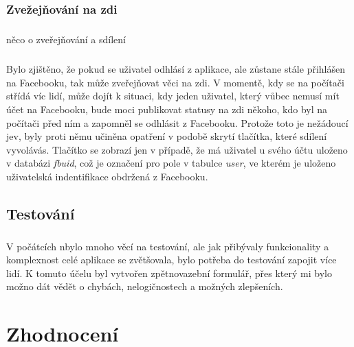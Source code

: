 \documentclass[11pt,a4paper,titlepage,oneside]{book}
\begin{document}
			\subsection{Zvežejňování na zdi}
				\paragraph{} {\Huge něco o zveřejňování a sdílení}
				\paragraph{} Bylo zjištěno, že pokud se uživatel odhlásí z aplikace, ale zůstane stále přihlášen na Facebooku, tak může zveřejňovat věci na zdi. V momentě, kdy se na počítači střídá víc lidí, může dojít k situaci, kdy jeden uživatel, který vůbec nemusí mít účet na Facebooku, bude moci publikovat statusy na zdi někoho, kdo byl na počítači před ním a zapomněl se odhlásit z Facebooku. Protože toto je nežádoucí jev, byly proti němu učiněna opatření v podobě skrytí tlačítka, které sdílení vyvolávás. Tlačítko se zobrazí jen v případě, že má uživatel u svého účtu uloženo v databázi \textit{fbuid}, což je označení pro pole v tabulce \textit{user}, ve kterém je uloženo uživatelská indentifikace obdržená z Facebooku.
		\section{Testování}
			\paragraph{}V počátcích nbylo mnoho věcí na testování, ale jak přibývaly funkcionality a komplexnost celé aplikace se zvětšovala, bylo potřeba do testování zapojit více lidí. K tomuto účelu byl vytvořen zpětnovazební formulář, přes který mi bylo možno dát vědět o chybách, nelogičnostech a možných zlepšeních.


	\chapter{Zhodnocení}
		\paragraph{}
\end{document}
